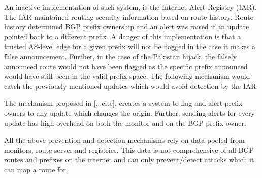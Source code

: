 An inactive implementation of such system, is the Internet Alert Registry (IAR). The IAR  maintained routing security information based on route history. Route history determined BGP prefix ownership and an alert was raised if an update pointed back to a different prefix. A danger of this implementation is that a trusted AS-level edge for a given prefix will not be flagged in the case it makes a false announcement. Further, in the case of the Pakistan hijack, the falsely announced route would not have been flagged as the specific prefix announced would have still been in the valid prefix space. The following mechanism would catch the previously mentioned updates which would avoid detection by the IAR.

The mechanism proposed in [...cite], creates a system to flag and alert prefix owners to any update which changes the origin. Further, sending alerts for every update has high overhead on both the monitor and on the BGP prefix owner.  

All the above prevention and detection mechanisms rely on data pooled from monitors, route server and registries. This data is not comprehensive of all BGP routes and prefixes on the internet and can only prevent/detect attacks which it can map a route for.
 
 